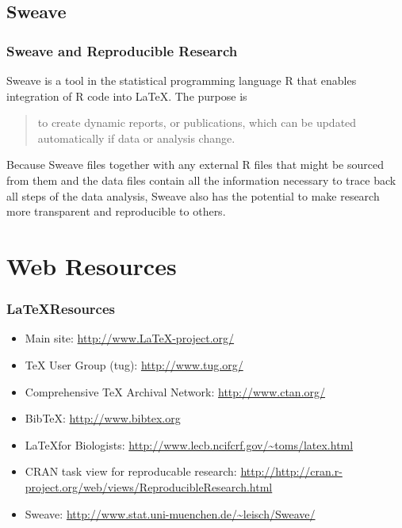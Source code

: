 \documentclass[pdf]{beamer}
\begin{document}
\subsection{Sweave}
\begin{frame}
  \frametitle{Sweave and Reproducible Research}
  Sweave is a tool in the statistical programming language R that enables integration of R code into \LaTeX. The purpose is 
\begin{quote}
 to create dynamic reports, or publications, which can be updated automatically if data or analysis change.
\end{quote}  
Because Sweave files together with any external R files that might be sourced from them and the data files contain all the information necessary to trace back all steps of the data analysis, Sweave also has the potential to make research more transparent and reproducible to others.
\end{frame}

\section{Web Resources}
\begin{frame}
  \frametitle{\LaTeX Resources}
  \begin{itemize}
  \item Main site: \url{http://www.LaTeX-project.org/}
  \item TeX User Group (tug): \url{http://www.tug.org/}
  \item Comprehensive TeX Archival Network: \url{http://www.ctan.org/}
  \item BibTeX: \url{http://www.bibtex.org}
  \item \LaTeX for Biologists: \url{http://www.lecb.ncifcrf.gov/~toms/latex.html}
  \item CRAN task view for reproducable research: \url{http://http://cran.r-project.org/web/views/ReproducibleResearch.html}
  \item Sweave: \url{http://www.stat.uni-muenchen.de/~leisch/Sweave/}
  \end{itemize}
  
\end{frame}
\end{document}
